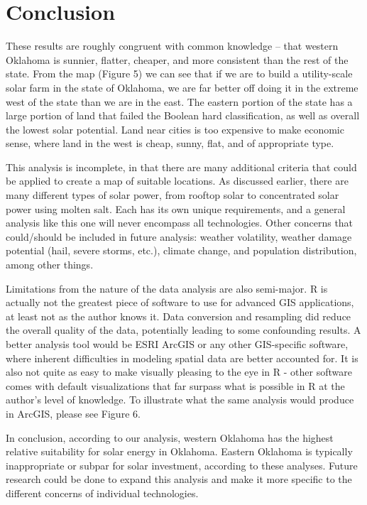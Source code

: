 \documentclass[12pt,english]{article}
\begin{document}
\pagebreak{}


\section{Conclusion}\label{sec:conclusion}

These results are roughly congruent with common knowledge – that western Oklahoma is sunnier, flatter, cheaper, and more consistent than the rest of the state. From the map (Figure 5) we can see that if we are to build a utility-scale solar farm in the state of Oklahoma, we are far better off doing it in the extreme west of the state than we are in the east. The eastern portion of the state has a large portion of land that failed the Boolean hard classification, as well as overall the lowest solar potential. Land near cities is too expensive to make economic sense, where land in the west is cheap, sunny, flat, and of appropriate type.  

This analysis is incomplete, in that there are many additional criteria that could be applied to create a map of suitable locations. As discussed earlier, there are many different types of solar power, from rooftop solar to concentrated solar power using molten salt. Each has its own unique requirements, and a general analysis like this one will never encompass all technologies. Other concerns that could/should be included in future analysis: weather volatility, weather damage potential (hail, severe storms, etc.), climate change, and population distribution, among other things.  

Limitations from the nature of the data analysis are also semi-major. R is actually not the greatest piece of software to use for advanced GIS applications, at least not as the author knows it. Data conversion and resampling did reduce the overall quality of the data, potentially leading to some confounding results. A better analysis tool would be ESRI ArcGIS or any other GIS-specific software, where inherent difficulties in modeling spatial data are better accounted for. It is also not quite as easy to make visually pleasing to the eye in R - other software comes with default visualizations that far surpass what is possible in R at the author's level of knowledge. To illustrate what the same analysis would produce in ArcGIS, please see Figure 6. 

In conclusion, according to our analysis, western Oklahoma has the highest relative suitability for solar energy in Oklahoma. Eastern Oklahoma is typically inappropriate or subpar for solar investment, according to these analyses. Future research could be done to expand this analysis and make it more specific to the different concerns of individual technologies.  
\end{document}
